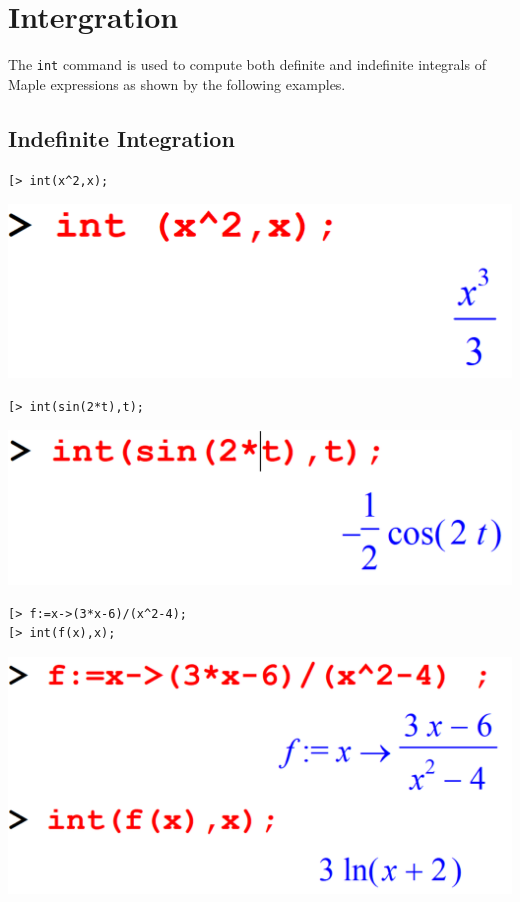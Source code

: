 \documentclass[
]{book}
\theoremstyle{definition}
\theoremstyle{definition}
\theoremstyle{definition}
\theoremstyle{definition}
\theoremstyle{remark}
\begin{document}
\chapter{Intergration}\label{intergration}

The \texttt{int} command is used to compute both definite and indefinite integrals of Maple expressions as shown by the following examples.

\section{Indefinite Integration}\label{indefinite-integration}

\begin{verbatim}
[> int(x^2,x);
\end{verbatim}

\includegraphics{figures/Lesson 6/fig1.png}

\begin{verbatim}
[> int(sin(2*t),t);
\end{verbatim}

\includegraphics{figures/Lesson 6/fig2.png}

\begin{verbatim}
[> f:=x->(3*x-6)/(x^2-4);
[> int(f(x),x);
\end{verbatim}

\includegraphics{figures/Lesson 6/fig3.png}
\end{document}
